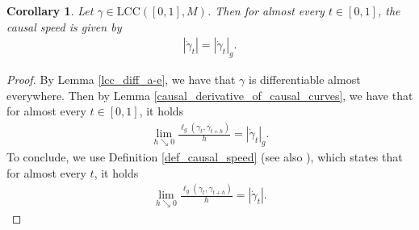 \documentclass[a4paper,10pt]{article}
\newtheorem{corollary}[theorem]{Corollary}
\numberwithin{equation}{section}
\begin{document}
\smallskip
\begin{corollary}\label{causal_speed_computed}
    Let $\gamma \in \mathrm{LCC}([0,1], M)$. Then for almost every $t \in [0,1]$, the causal speed is given by 
    \begin{align}
        |\dot{\gamma}_t|= |\dot{\gamma}_t|_g.
    \end{align}
\end{corollary}
\begin{proof}
    By Lemma \ref{lcc_diff_a-e}, we have that $\gamma$ is differentiable almost everywhere. Then by Lemma \ref{causal_derivative_of_causal_curves}, we have that for almost every $t \in [0,1]$, it holds
    \begin{align}
        \lim_{h \searrow 0} \frac{\ell_g(\gamma_t, \gamma_{t+h})}{h} = |\dot{\gamma}_t|_g.
    \end{align}
    To conclude, we use Definition \ref{def_causal_speed} (see also \cite[(2.28)]{beran2024nonlinear}), which states that for almost every $t$, it holds
    \begin{align*}
        \lim_{h \searrow 0} \frac{\ell_g(\gamma_t, \gamma_{t+h})}{h} = |\dot{\gamma}_t|.
    \end{align*}
\end{proof} 
\smallskip
\end{document}
